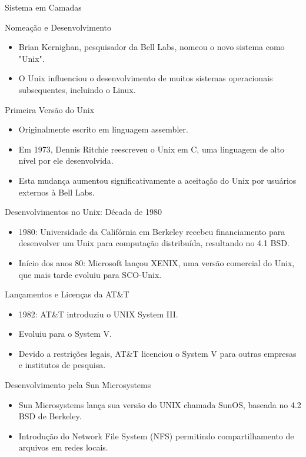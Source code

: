 \documentclass{beamer}
\begin{document}
\begin{frame}{Sistema em Camadas}
\begin{frame}{Nomeação e Desenvolvimento}
    \begin{itemize}
        \item Brian Kernighan, pesquisador da Bell Labs, nomeou o novo sistema como "Unix".
        \item O Unix influenciou o desenvolvimento de muitos sistemas operacionais subsequentes, incluindo o Linux.
    \end{itemize}
\end{frame}
\begin{frame}{Primeira Versão do Unix}
    \begin{itemize}
        \item Originalmente escrito em linguagem assembler.
        \item Em 1973, Dennis Ritchie reescreveu o Unix em C, uma linguagem de alto nível por ele desenvolvida.
        \item Esta mudança aumentou significativamente a aceitação do Unix por usuários externos à Bell Labs.
    \end{itemize}
\end{frame}

\begin{frame}{Desenvolvimentos no Unix: Década de 1980}
    \begin{itemize}
        \item 1980: Universidade da Califórnia em Berkeley recebeu financiamento para desenvolver um Unix para computação distribuída, resultando no 4.1 BSD.
        \item Início dos anos 80: Microsoft lançou XENIX, uma versão comercial do Unix, que mais tarde evoluiu para SCO-Unix.
    \end{itemize}
\end{frame}

\begin{frame}{Lançamentos e Licenças da AT\&T}
    \begin{itemize}
        \item 1982: AT\&T introduziu o UNIX System III.
        \item Evoluiu para o System V.
        \item Devido a restrições legais, AT\&T licenciou o System V para outras empresas e institutos de pesquisa.
    \end{itemize}
\end{frame}
\begin{frame}{Desenvolvimento pela Sun Microsystems}
    \begin{itemize}
        \item Sun Microsystems lança sua versão do UNIX chamada SunOS, baseada no 4.2 BSD de Berkeley.
        \item Introdução do Network File System (NFS) permitindo compartilhamento de arquivos em redes locais.
    \end{itemize}
\end{frame}


\end{frame}
\end{document}
